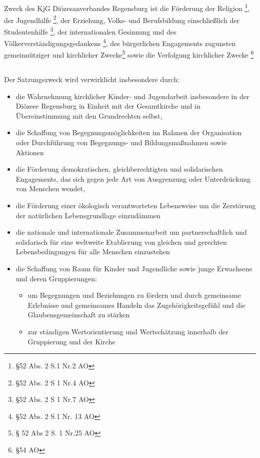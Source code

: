 \documentclass[12pt]{report}
\begin{document}
\begin{flushleft}
\subsection{}
\label{sec:Zweck}
Zweck des KjG Diözesanverbandes Regensburg ist die
Förderung der Religion \footnote{§52 Abs. 2 S.1 Nr.2 AO},
der Jugendhilfe \footnote{§52 Abs. 2 S 1 Nr.4 AO},
der Erziehung, Volks- und Berufsbildung einschließlich
der Studentenhilfe \footnote{§52 Abs. 2 S 1 Nr.7 AO}, der internationalen Gesinnung und des
Völkerverständigungsgedankens \footnote{§52 Abs. 2 S.1 Nr. 13 AO}, des bürgerlichen Engagements zugunsten
gemeinnütziger und kirchlicher Zwecke\footnote{§ 52 Abs 2 S. 1 Nr.25 AO}
sowie die Verfolgung kirchlicher Zwecke \footnote{§54 AO}

\subsection{}
Der Satzungszweck wird verwirklicht insbesondere durch:
\begin{itemize}
  \item die Wahrnehmung kirchlicher Kinder- und Jugendarbeit insbesondere in der Diözese Regensburg
        in Einheit mit der Gesamtkirche und in Übereinstimmung mit den Grundrechten selbst,
  \item die Schaffung von Begegnungsmöglichkeiten im Rahmen der Organisation oder Durchführung von
        Begegnungs- und Bildungsmaßnahmen sowie Aktionen
  \item die Förderung demokratischen, gleichberechtigten und solidarischen Engagements, das sich
        gegen jede Art von Ausgrenzung oder Unterdrückung von Menschen wendet,
  \item die Förderung einer ökologisch verantworteten Lebensweise um die Zerstörung der
          natürlichen Lebensgrundlage einzudämmen
  \item die nationale und internationale Zusammenarbeit um partnerschaftlich und solidarisch für
        eine weltweite Etablierung von gleichen und gerechten Lebensbedingungen für alle Menschen einzustehen
  \item die Schaffung von Raum für Kinder und Jugendliche sowie junge Erwachsene und deren
        Gruppierungen:
    \begin{itemize}
      \item um Begegnungen und Beziehungen zu fördern und durch gemeinsame Erlebnisse und gemeinsames Handeln
            das Zugehörigkeitsgefühl und die Glaubensgemeinschaft zu stärken
      \item zur ständigen Wertorientierung und Wertschätzung innerhalb der Gruppierung und der Kirche

\end{itemize}
\end{itemize}
\end{flushleft}
\end{document}
